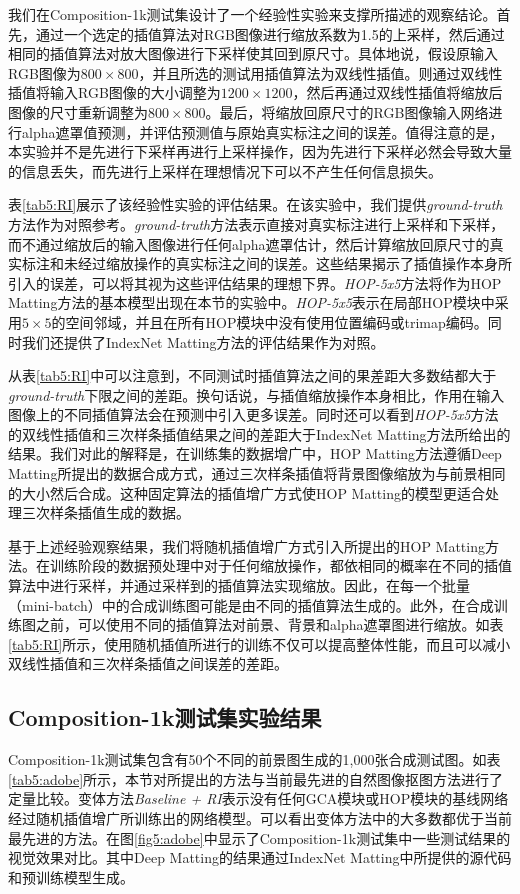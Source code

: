 我们在Composition-1k测试集\cite{xu2017deep}设计了一个经验性实验来支撑所描述的观察结论。首先，通过一个选定的插值算法对RGB图像进行缩放系数为1.5的上采样，然后通过相同的插值算法对放大图像进行下采样使其回到原尺寸。具体地说，假设原输入RGB图像为$800 \times 800$，并且所选的测试用插值算法为双线性插值。则通过双线性插值将输入RGB图像的大小调整为$1200 \times 1200$，然后再通过双线性插值将缩放后图像的尺寸重新调整为$800\times 800$。最后，将缩放回原尺寸的RGB图像输入网络进行alpha遮罩值预测，并评估预测值与原始真实标注之间的误差。值得注意的是，本实验并不是先进行下采样再进行上采样操作，因为先进行下采样必然会导致大量的信息丢失，而先进行上采样在理想情况下可以不产生任何信息损失。


表\ref{tab5:RI}展示了该经验性实验的评估结果。在该实验中，我们提供\textit{ground-truth}方法作为对照参考。\textit{ground-truth}方法表示直接对真实标注进行上采样和下采样，而不通过缩放后的输入图像进行任何alpha遮罩估计，然后计算缩放回原尺寸的真实标注和未经过缩放操作的真实标注之间的误差。这些结果揭示了插值操作本身所引入的误差，可以将其视为这些评估结果的理想下界。\textit{HOP-5x5}方法将作为HOP Matting方法的基本模型出现在本节的实验中。\textit{HOP-5x5}表示在局部HOP模块中采用$5\times 5$的空间邻域，并且在所有HOP模块中没有使用位置编码或trimap编码。同时我们还提供了IndexNet Matting\cite{lu2019indices}方法的评估结果作为对照。

从表\ref{tab5:RI}中可以注意到，不同测试时插值算法之间的果差距大多数结都大于\textit{ground-truth}下限之间的差距。换句话说，与插值缩放操作本身相比，作用在输入图像上的不同插值算法会在预测中引入更多误差。同时还可以看到\textit{HOP-5x5}方法的双线性插值和三次样条插值结果之间的差距大于IndexNet Matting\cite{lu2019indices}方法所给出的结果。我们对此的解释是，在训练集的数据增广中，HOP Matting方法遵循Deep Matting\cite{xu2017deep}所提出的数据合成方式，通过三次样条插值将背景图像缩放为与前景相同的大小然后合成。这种固定算法的插值增广方式使HOP Matting的模型更适合处理三次样条插值生成的数据。

基于上述经验观察结果，我们将随机插值增广方式引入所提出的HOP Matting方法。在训练阶段的数据预处理中对于任何缩放操作，都依相同的概率在不同的插值算法中进行采样，并通过采样到的插值算法实现缩放。因此，在每一个批量（mini-batch）中的合成训练图可能是由不同的插值算法生成的。此外，在合成训练图之前，可以使用不同的插值算法对前景、背景和alpha遮罩图进行缩放。如表\ref{tab5:RI}所示，使用随机插值所进行的训练不仅可以提高整体性能，而且可以减小双线性插值和三次样条插值之间误差的差距。

\subsection{Composition-1k测试集实验结果}
Composition-1k测试集\cite{xu2017deep}包含有50个不同的前景图生成的1,000张合成测试图。如表\ref{tab5:adobe}所示，本节对所提出的方法与当前最先进的自然图像抠图方法进行了定量比较。变体方法\textit{Baseline + RI}表示没有任何GCA模块或HOP模块的基线网络经过随机插值增广所训练出的网络模型。可以看出变体方法中的大多数都优于当前最先进的方法。在图\ref{fig5:adobe}中显示了Composition-1k测试集中一些测试结果的视觉效果对比。其中Deep Matting\cite{xu2017deep}的结果通过IndexNet Matting\cite{lu2019indices}中所提供的源代码和预训练模型生成。

